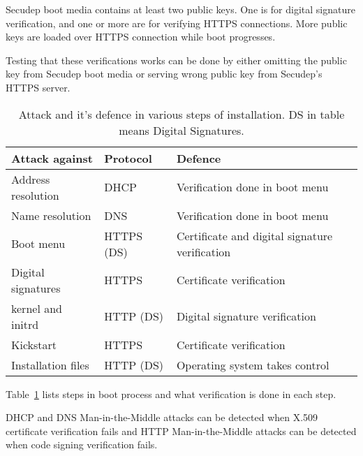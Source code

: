 Secudep boot media contains at least two public keys. One is for
digital signature verification, and one or more are for verifying
HTTPS connections. More public keys are loaded over HTTPS connection
while boot progresses.

Testing that these verifications works can be done by either omitting
the public key from Secudep boot media or serving wrong public key
from Secudep's HTTPS server.

\begin{table}[!ht]
  \def\arraystretch{1.1}%
  \begin{center}
    \begin{tabular}{| l | l | l |}
      \hline
      Attack against     & Protocol   & Defence                                        \\
      \hline
      Address resolution & DHCP       & Verification done in boot menu              \\
      Name resolution    & DNS        & Verification done in boot menu              \\
      Boot menu          & HTTPS (DS) & Certificate and digital signature verification \\
      Digital signatures & HTTPS      & Certificate verification                       \\
      kernel and initrd  & HTTP (DS)  & Digital signature verification                 \\
      Kickstart          & HTTPS      & Certificate verification                       \\
      Installation files & HTTP (DS)  & Operating system takes control                 \\
      \hline
    \end{tabular}
    \caption{Attack and it's defence in various steps of
      installation. DS in table means Digital
      Signatures.\label{tab:attack_and_defence}}
  \end{center}
\end{table}


Table~\ref{tab:attack_and_defence} lists steps in boot process and
what verification is done in each step.

DHCP and DNS Man-in-the-Middle attacks can be detected when X.509
certificate verification fails and HTTP Man-in-the-Middle attacks can
be detected when code signing verification fails.


